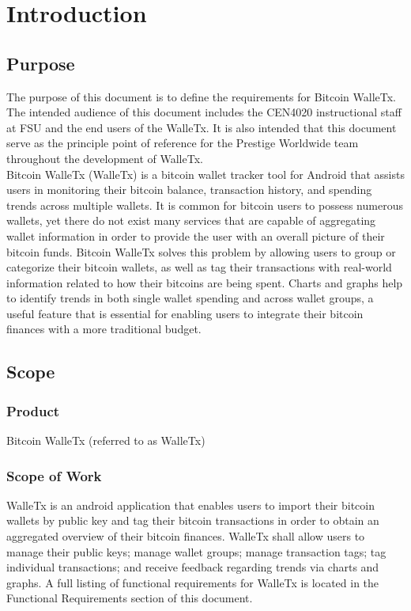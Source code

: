 \section{Introduction}

	\subsection{Purpose}
		The purpose of this document is to define the requirements for Bitcoin WalleTx. The intended audience of this document includes the CEN4020 instructional staff at FSU and the end users of the WalleTx. It is also intended that this document serve as the principle point of reference for the Prestige Worldwide team throughout the development of WalleTx.\\

	Bitcoin WalleTx (WalleTx) is a bitcoin wallet tracker tool for Android that assists users in monitoring their bitcoin balance, transaction history, and spending trends across multiple wallets. It is common for bitcoin users to possess numerous wallets, yet there do not exist many services that are capable of aggregating wallet information in order to provide the user with an overall picture of their bitcoin funds. Bitcoin WalleTx solves this problem by allowing users to group or categorize their bitcoin wallets, as well as tag their transactions with real-world information related to how their bitcoins are being spent. Charts and graphs help to identify trends in both single wallet spending and across wallet groups, a useful feature that is essential for enabling users to integrate their bitcoin finances with a more traditional budget.\\

	\subsection{Scope}
	
  \subsubsection{Product}
  Bitcoin WalleTx (referred to as WalleTx)

  \subsubsection{Scope of Work}
  WalleTx is an android application that enables users to import their bitcoin wallets by public key and tag their bitcoin transactions in order to obtain an aggregated overview of their bitcoin finances. WalleTx shall allow users to manage their public keys; manage wallet groups; manage transaction tags; tag individual transactions; and receive feedback regarding trends via charts and graphs. A full listing of functional requirements for WalleTx is located in the Functional Requirements section of this document.
	
